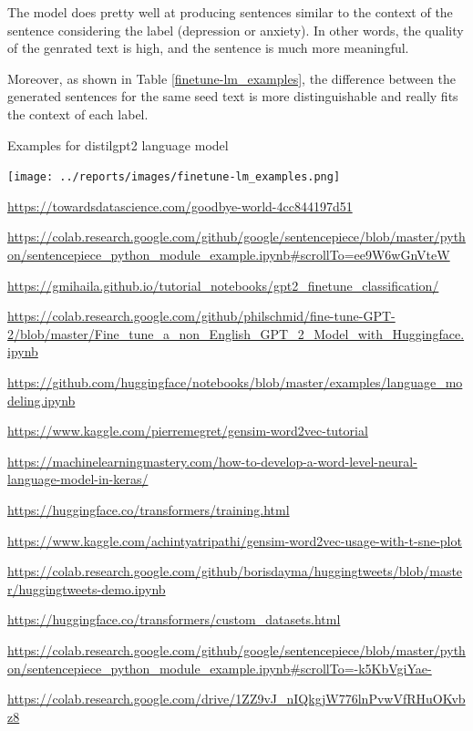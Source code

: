 \documentclass[12pt, a4paper]{article}
\begin{document}
	The model does pretty well at producing sentences similar to the context of the sentence considering the label (depression or anxiety). In other words, the quality of the genrated text is high, and the sentence is much more meaningful. 
	
	Moreover, as shown in Table \ref{finetune-lm_examples}, the difference between the generated sentences for the same seed text is more distinguishable and really fits the context of each label.
	
	\begin{table}[H]
		\caption{Examples for distilgpt2 language model}
		\centering
		\texttt{[image: ../reports/images/finetune-lm\_examples.png]}	
		\label{finetune-lm_examples}
	\end{table}
	
	
	\newpage
	\begin{thebibliography}{9}
		\url{https://towardsdatascience.com/goodbye-world-4cc844197d51}
		
		\url{https://colab.research.google.com/github/google/sentencepiece/blob/master/python/sentencepiece_python_module_example.ipynb#scrollTo=ee9W6wGnVteW}
		
		\url{https://gmihaila.github.io/tutorial_notebooks/gpt2_finetune_classification/}
		
		\url{https://colab.research.google.com/github/philschmid/fine-tune-GPT-2/blob/master/Fine_tune_a_non_English_GPT_2_Model_with_Huggingface.ipynb}
		
		\url{https://github.com/huggingface/notebooks/blob/master/examples/language_modeling.ipynb}
		
		\url{https://www.kaggle.com/pierremegret/gensim-word2vec-tutorial}
		
		\url{https://machinelearningmastery.com/how-to-develop-a-word-level-neural-language-model-in-keras/}
		
		\url{https://huggingface.co/transformers/training.html}
		
		\url{https://www.kaggle.com/achintyatripathi/gensim-word2vec-usage-with-t-sne-plot}
		
		\url{https://colab.research.google.com/github/borisdayma/huggingtweets/blob/master/huggingtweets-demo.ipynb}
		
		\url{https://huggingface.co/transformers/custom_datasets.html}
		
		\url{https://colab.research.google.com/github/google/sentencepiece/blob/master/python/sentencepiece_python_module_example.ipynb#scrollTo=-k5KbVgiYae-}
		
		\url{https://colab.research.google.com/drive/1ZZ9vJ_nIQkgjW776lnPvwVfRHuOKvbz8}
		
	\end{thebibliography}
	
\end{document}
